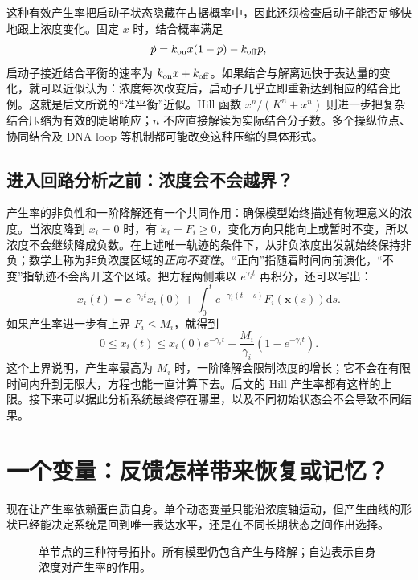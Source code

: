 \documentclass[11pt,a4paper,UTF8,fontset=fandol]{ctexart}
\newcommand{\dd}{\mathrm d}\newcommand{\R}{\mathbb R}\newcommand{\ssv}{\mathrm{ss}}
\begin{document}
这种有效产生率把启动子状态隐藏在占据概率中，因此还须检查启动子能否足够快地跟上浓度变化。固定 $x$ 时，结合概率满足
\[
\dot p=k_{\rm on}x(1-p)-k_{\rm off}p,
\]
启动子接近结合平衡的速率为 $k_{\rm on}x+k_{\rm off}$。如果结合与解离远快于表达量的变化，就可以近似认为：浓度每次改变后，启动子几乎立即重新达到相应的结合比例。这就是后文所说的“准平衡”近似。Hill 函数 $x^n/(K^n+x^n)$ 则进一步把复杂结合压缩为有效的陡峭响应；$n$ 不应直接解读为实际结合分子数。多个操纵位点、协同结合及 DNA loop 等机制都可能改变这种压缩的具体形式。

\subsection{进入回路分析之前：浓度会不会越界？}
产生率的非负性和一阶降解还有一个共同作用：确保模型始终描述有物理意义的浓度。当浓度降到 $x_i=0$ 时，有 $\dot x_i=F_i\geq0$，变化方向只能向上或暂时不变，所以浓度不会继续降成负数。在上述唯一轨迹的条件下，从非负浓度出发就始终保持非负；数学上称为非负浓度区域的\emph{正向不变性}。“正向”指随着时间向前演化，“不变”指轨迹不会离开这个区域。把方程两侧乘以 $e^{\gamma_i t}$ 再积分，还可以写出：
\[
x_i(t)=e^{-\gamma_it}x_i(0)+\int_0^t e^{-\gamma_i(t-s)}F_i(\bm x(s))\dd s.
\]
如果产生率进一步有上界 $F_i\leq M_i$，就得到
\begin{equation}
0\leq x_i(t)\leq x_i(0)e^{-\gamma_it}+\frac{M_i}{\gamma_i}(1-e^{-\gamma_it}).\label{eq:bound}
\end{equation}
这个上界说明，产生率最高为 $M_i$ 时，一阶降解会限制浓度的增长；它不会在有限时间内升到无限大，方程也能一直计算下去。后文的 Hill 产生率都有这样的上限。接下来可以据此分析系统最终停在哪里，以及不同初始状态会不会导致不同结果。

\section{一个变量：反馈怎样带来恢复或记忆？}
现在让产生率依赖蛋白质自身。单个动态变量只能沿浓度轴运动，但产生曲线的形状已经能决定系统是回到唯一表达水平，还是在不同长期状态之间作出选择。

\begin{figure}[H]\centering
{}
\caption{单节点的三种符号拓扑。所有模型仍包含产生与降解；自边表示自身浓度对产生率的作用。}
\end{figure}
\end{document}
